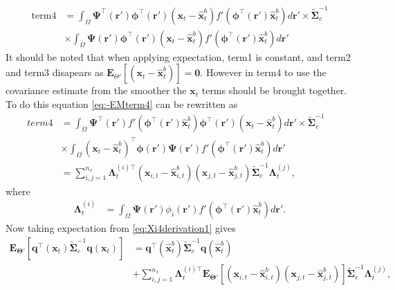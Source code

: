 \documentclass[]{article}
\begin{document}
\begin{align}\label{eq:-EMterm4}
 \mathrm{term4} &=\int_\Omega \boldsymbol{\Psi}^\top(\mathbf{r}')\boldsymbol \phi^\top(\mathbf r') (\mathbf x_t - \mathbf  {\hat x}_t^b)f'(\boldsymbol \phi^\top(\mathbf r')\mathbf {\hat x}_t^b) d\mathbf{r}' \times \tilde{\boldsymbol  \Sigma}_e^{-1} \nonumber \\
&\times \int_\Omega \boldsymbol{\Psi}(\mathbf{r}')\boldsymbol \phi^\top(\mathbf r') (\mathbf x_t - \mathbf  {\hat x}_t^b)f'(\boldsymbol \phi^\top(\mathbf r')\mathbf {\hat x}_t^b) d\mathbf{r}' 
\end{align}
It should be noted that when applying expectation, term1 is constant, and term2 and term3 disapears as $\mathbf E_{\Theta'}\left[(\mathbf x_t - \mathbf  {\hat x}_t^b)\right]= \mathbf 0$. However in term4 to use the covariance estimate from the smoother the $\mathbf{x}_t$ terms should be brought together. To do this equation \eqref{eq:-EMterm4} can be rewritten as 
\begin{align}
 term4 &= \int_\Omega \boldsymbol{\Psi}^\top(\mathbf{r}')f'(\boldsymbol \phi^\top(\mathbf r')\mathbf {\hat x}_t^b) \boldsymbol \phi^\top(\mathbf r')(\mathbf x_t - \mathbf  {\hat x}_t^b)d\mathbf{r}' \times \tilde{\boldsymbol\Sigma}_e^{-1} \nonumber \\
&\times\int_\Omega  (\mathbf x_t - \mathbf  {\hat x}_t^b)^\top\boldsymbol \phi(\mathbf r') \boldsymbol{\Psi}(\mathbf{r}')f'(\boldsymbol \phi^\top(\mathbf r')\mathbf {\hat x}_t^b) d\mathbf{r}'& \nonumber \\
&=\sum_{i,j=1}^{n_x}{\boldsymbol\Lambda}_t^{(i)\top}(\mathbf x_{i,t} - \mathbf  {\hat x}_{i,t}^b)(\mathbf x_{j,t} - \mathbf  {\hat x}_{j,t}^b)\tilde{\boldsymbol\Sigma}_e^{-1}{\boldsymbol\Lambda}_t^{(j)},
\end{align}
where
\begin{align}\label{eq:EM-Lambdat}
	{\boldsymbol \Lambda}_t^{(i)}&=\int_{\Omega} \boldsymbol \Psi(\mathbf r')\phi_i(\mathbf r')f'(\boldsymbol\phi^\top(\mathbf r')\mathbf {\hat x}_t^b)d\mathbf r'.
\end{align}
Now taking expectation from \eqref{eq:Xi4derivation1} gives
\begin{align}\label{eq:Xi4derivation2}
  \mathbf{E}_{\boldsymbol\Theta'}\left[ \mathbf q^\top(\mathbf x_t)\tilde{\boldsymbol\Sigma}_e^{-1}\mathbf q(\mathbf x_t)\right] &= \mathbf q^\top(\mathbf {\hat x}_t^b)\tilde{\boldsymbol\Sigma}_e^{-1}\mathbf q(\mathbf {\hat x}_t^b)\nonumber \\
&+\sum_{i,j=1}^{n_x}{\boldsymbol\Lambda}_t^{(i)\top}\mathbf{E}_{\boldsymbol\Theta'}\left[(\mathbf x_{i,t} - \mathbf  {\hat x}_{i,t}^b)(\mathbf x_{j,t} - \mathbf  {\hat x}_{j,t}^b)\right] \tilde{\boldsymbol\Sigma}_e^{-1}{\boldsymbol\Lambda}_t^{(j)},
\end{align}
\end{document}
